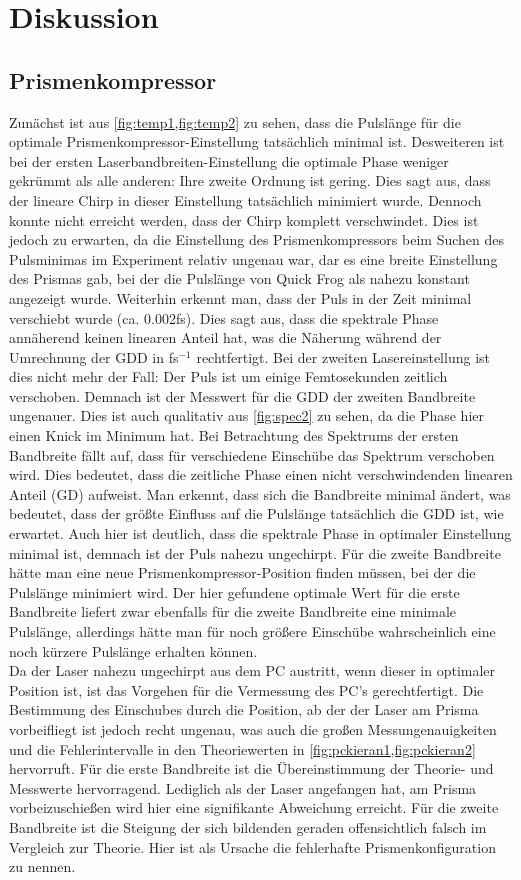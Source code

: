 \documentclass[twoside,        %
               BCOR12mm,       %
               english,ngerman, %
               fleqn,headsepline=false,footsepline=false
              ]{Vorlage/MFPREPORT}
\begin{document}
\newpage
\section{Diskussion}
\subsection{Prismenkompressor}
Zunächst ist aus \cref{fig:temp1,fig:temp2} zu sehen, dass die Pulslänge für
die optimale Prismenkompressor-Einstellung tatsächlich minimal ist. Desweiteren
ist bei der ersten Laserbandbreiten-Einstellung die optimale Phase weniger
gekrümmt als alle anderen: Ihre zweite Ordnung ist gering. Dies sagt aus, dass
der lineare Chirp in dieser Einstellung tatsächlich minimiert wurde. Dennoch
konnte nicht erreicht werden, dass der Chirp komplett verschwindet. Dies ist
jedoch zu erwarten, da die Einstellung des Prismenkompressors beim Suchen des
Pulsminimas im Experiment relativ ungenau war, dar es eine breite Einstellung
des Prismas gab, bei der die Pulslänge von Quick Frog als nahezu konstant
angezeigt wurde. Weiterhin erkennt man, dass der Puls in der Zeit minimal
verschiebt wurde (ca. 0.002\;fs). Dies sagt aus, dass die spektrale Phase
annäherend keinen linearen Anteil hat, was die Näherung während der Umrechnung
der GDD in fs$^{-1}$ rechtfertigt. Bei der zweiten Lasereinstellung ist dies
nicht mehr der Fall: Der Puls ist um einige Femtosekunden zeitlich verschoben.
Demnach ist der Messwert für die GDD der zweiten Bandbreite ungenauer. Dies ist
auch qualitativ aus \cref{fig:spec2} zu sehen, da die Phase hier einen Knick im
Minimum hat. Bei Betrachtung des Spektrums der ersten Bandbreite fällt auf,
dass für verschiedene Einschübe das Spektrum verschoben wird. Dies bedeutet,
dass die zeitliche Phase einen nicht verschwindenden linearen Anteil (GD)
aufweist. Man erkennt, dass sich die Bandbreite minimal ändert, was bedeutet,
dass der größte Einfluss auf die Pulslänge tatsächlich die GDD ist, wie
erwartet. Auch hier ist deutlich, dass die spektrale Phase in optimaler
Einstellung minimal ist, demnach ist der Puls nahezu ungechirpt.
Für die zweite Bandbreite hätte man eine neue Prismenkompressor-Position finden
müssen, bei der die Pulslänge minimiert wird. Der hier gefundene optimale Wert
für die erste Bandbreite liefert zwar ebenfalls für die zweite Bandbreite eine
minimale Pulslänge, allerdings hätte man für noch größere Einschübe
wahrscheinlich eine noch kürzere Pulslänge erhalten können.\\
Da der Laser nahezu ungechirpt aus dem PC austritt, wenn dieser in optimaler
Position ist, ist das Vorgehen für die Vermessung des PC's gerechtfertigt. Die
Bestimmung des Einschubes durch die Position, ab der der Laser am Prisma
vorbeifliegt ist jedoch recht ungenau, was auch die großen Messungenauigkeiten
und die Fehlerintervalle in den Theoriewerten in
\cref{fig:pckieran1,fig:pckieran2} hervorruft. Für die erste Bandbreite ist die
Übereinstimmung der Theorie- und Messwerte hervorragend. Lediglich als der
Laser angefangen hat, am Prisma vorbeizuschießen wird hier eine signifikante
Abweichung erreicht. Für die zweite Bandbreite ist die Steigung der sich
bildenden geraden offensichtlich falsch im Vergleich zur Theorie. Hier ist als
Ursache die fehlerhafte Prismenkonfiguration zu nennen.
\end{document}
